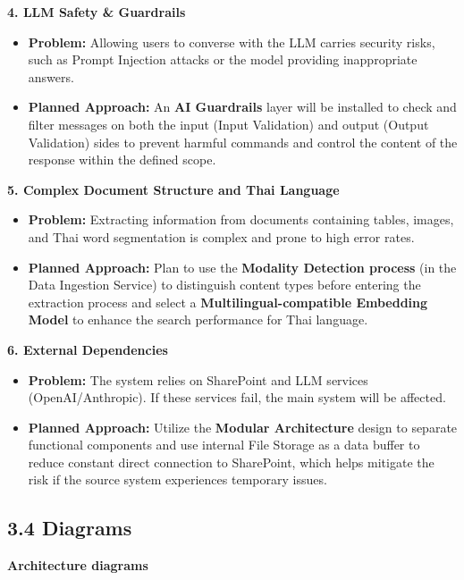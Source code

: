 \documentclass[12pt]{article}
\begin{document}
\textbf{4. LLM Safety \& Guardrails}

\begin{itemize}
\item
  \textbf{Problem:} Allowing users to converse with the LLM carries
  security risks, such as Prompt Injection attacks or the model
  providing inappropriate answers.
\item
  \textbf{Planned Approach:} An \textbf{AI Guardrails} layer will be
  installed to check and filter messages on both the input (Input
  Validation) and output (Output Validation) sides to prevent harmful
  commands and control the content of the response within the defined
  scope.
\end{itemize}

\textbf{5. Complex Document Structure and Thai Language}

\begin{itemize}
\item
  \textbf{Problem:} Extracting information from documents containing
  tables, images, and Thai word segmentation is complex and prone to
  high error rates.
\item
  \textbf{Planned Approach:} Plan to use the \textbf{Modality Detection
  process} (in the Data Ingestion Service) to distinguish content types
  before entering the extraction process and select a
  \textbf{Multilingual-compatible Embedding Model} to enhance the search
  performance for Thai language.
\end{itemize}

\textbf{6. External Dependencies}

\begin{itemize}
\item
  \textbf{Problem:} The system relies on SharePoint and LLM services
  (OpenAI/Anthropic). If these services fail, the main system will be
  affected.
\item
  \textbf{Planned Approach:} Utilize the \textbf{Modular Architecture}
  design to separate functional components and use internal File Storage
  as a data buffer to reduce constant direct connection to SharePoint,
  which helps mitigate the risk if the source system experiences
  temporary issues.
\end{itemize}

\subsection{3.4 Diagrams}\label{diagrams}

\textbf{Architecture diagrams}
\end{document}

